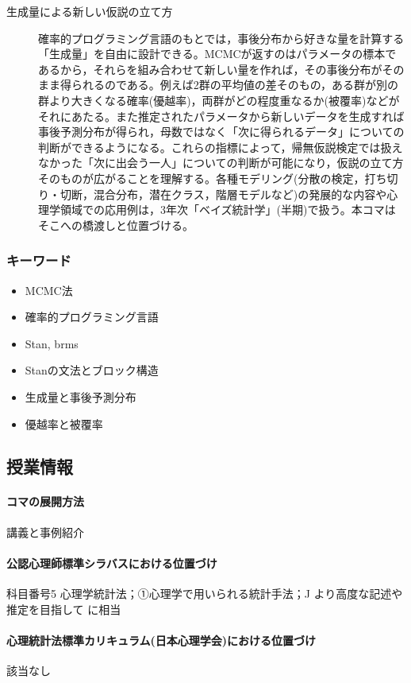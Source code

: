 \begin{description}
	\item[生成量による新しい仮説の立て方] 確率的プログラミング言語のもとでは，事後分布から好きな量を計算する「生成量」を自由に設計できる。MCMCが返すのはパラメータの標本であるから，それらを組み合わせて新しい量を作れば，その事後分布がそのまま得られるのである。例えば2群の平均値の差そのもの，ある群が別の群より大きくなる確率(優越率)，両群がどの程度重なるか(被覆率)などがそれにあたる。また推定されたパラメータから新しいデータを生成すれば事後予測分布が得られ，母数ではなく「次に得られるデータ」についての判断ができるようになる。これらの指標によって，帰無仮説検定では扱えなかった「次に出会う一人」についての判断が可能になり，仮説の立て方そのものが広がることを理解する。各種モデリング(分散の検定，打ち切り・切断，混合分布，潜在クラス，階層モデルなど)の発展的な内容や心理学領域での応用例は，3年次「ベイズ統計学」(半期)で扱う。本コマはそこへの橋渡しと位置づける。
\end{description}

\subsubsection{キーワード}
\begin{itemize}
	\item MCMC法
	\item 確率的プログラミング言語
	\item Stan, brms
	\item Stanの文法とブロック構造
	\item 生成量と事後予測分布
	\item 優越率と被覆率
\end{itemize}
\subsection{授業情報}
\paragraph{コマの展開方法}
講義と事例紹介
\paragraph{公認心理師標準シラバスにおける位置づけ}
科目番号5 心理学統計法；①心理学で用いられる統計手法；J より高度な記述や推定を目指して に相当
\paragraph{心理統計法標準カリキュラム(日本心理学会)における位置づけ}
該当なし
